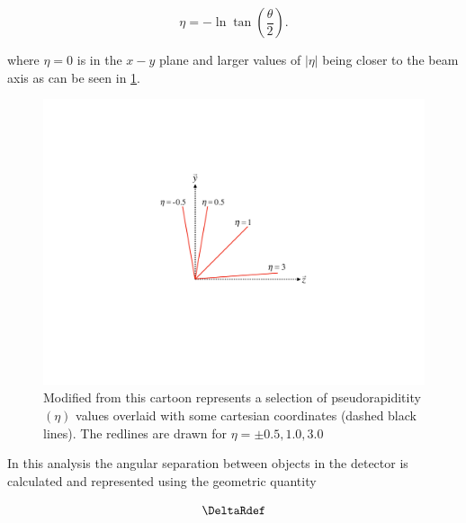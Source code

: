 \begin{equation}
 \eta = -\ln \tan \left( \frac{\theta}{2} \right).
\end{equation}

where $\eta = 0$ is in the $x-y$ plane and larger values of $|\eta|$ being
closer to the beam axis as can be seen in \cref{fig:pseudorapidity}.

\begin{figure}[!htbp]
  \begin{center}
    \includegraphics[width=0.5\linewidth]{figures/atlas/pseudorapidity}
    \caption{Modified from \cite{Stark:2317296} this cartoon represents a
selection of pseudorapiditity $(\eta)$ values overlaid with some cartesian
coordinates (dashed black lines).  The redlines are drawn for $\eta = \pm
0.5,1.0,3.0$ }
    \label{fig:pseudorapidity}
  \end{center}
\end{figure}

In this analysis the angular separation between objects in the detector is
calculated and represented using the geometric quantity 

\begin{equation}
 \DeltaRdef
\end{equation}

